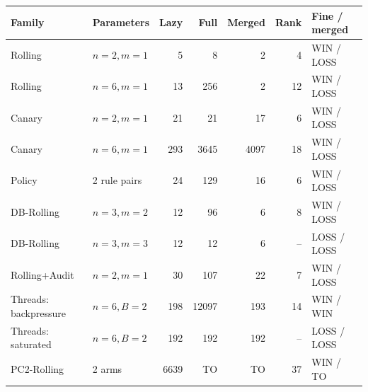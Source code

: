 \begin{tabular}{llrrrrl}
\toprule
Family & Parameters & Lazy & Full & Merged & Rank & Fine / merged \\
\midrule
Rolling & $n=2,m=1$ & 5 & 8 & 2 & 4 & WIN / LOSS \\
Rolling & $n=6,m=1$ & 13 & 256 & 2 & 12 & WIN / LOSS \\
Canary & $n=2,m=1$ & 21 & 21 & 17 & 6 & WIN / LOSS \\
Canary & $n=6,m=1$ & 293 & 3645 & 4097 & 18 & WIN / LOSS \\
Policy & 2 rule pairs & 24 & 129 & 16 & 6 & WIN / LOSS \\
DB-Rolling & $n=3,m=2$ & 12 & 96 & 6 & 8 & WIN / LOSS \\
DB-Rolling & $n=3,m=3$ & 12 & 12 & 6 & -- & LOSS / LOSS \\
Rolling+Audit & $n=2,m=1$ & 30 & 107 & 22 & 7 & WIN / LOSS \\
Threads: backpressure & $n=6,B=2$ & 198 & 12097 & 193 & 14 & WIN / WIN \\
Threads: saturated & $n=6,B=2$ & 192 & 192 & 192 & -- & LOSS / LOSS \\
PC2-Rolling & 2 arms & 6639 & TO & TO & 37 & WIN / TO \\
\bottomrule
\end{tabular}
